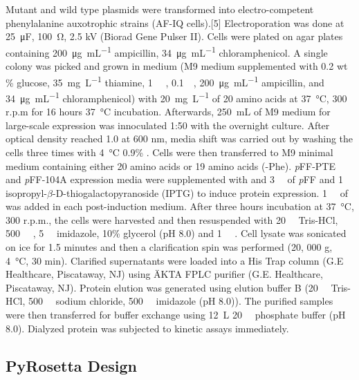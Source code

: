 \begin{refsection}
Mutant and wild type plasmids were transformed into electro-competent  phenylalanine auxotrophic strains (AF-IQ cells).[5] Electroporation was
done at \SI{25}{\micro\farad}, \SI{100}{\ohm}, 2.5 kV (Biorad Gene Pulser II).
Cells were plated on agar plates containing \SI{200}{\ug\per\mL} ampicillin,
\SI{34}{\ug\per\mL} chloramphenicol. A single colony was picked and grown in
medium (M9 medium supplemented with 0.2 wt \% glucose, \SI{35}{\mg\per\L}
thiamine, \SI{1}{\milli\Molar} , \SI{0.1}{\milli\Molar},
\SI{200}{\ug\per\mL} ampicillin, and \SI{34}{\ug\per\mL} chloramphenicol) with
\SI{20}{\mg\per\L} of 20 amino acids at \SI{37}{\celsius}, 300 r.p.m for 16
hours \SI{37}{\celsius} incubation.  Afterwards, \SI{250}{\mL} of M9 medium for
large-scale expression was innoculated 1:50 with the overnight culture.  After
optical density reached 1.0 at 600 nm, media shift was carried out by washing
the cells three times with \SI{4}{\celsius} 0.9\% .  Cells were then
transferred to M9 minimal medium containing either 20 amino acids or 19 amino
acids (-Phe). \emph{p}FF-PTE and \emph{p}FF-104A expression media were
supplemented with and \SI{3}{\milli\Molar} of \emph{p}FF and
\SI{1}{\milli\Molar} isopropyl-$\beta$-D-thiogalactopyranoside (IPTG) to induce
protein expression.  \SI{1}{\milli\Molar} of  was added in each
post-induction medium.  After three hours incubation at \SI{37}{\celsius}, 300
r.p.m., the cells were harvested and then resuspended with
\SI{20}{\milli\Molar} Tris-HCl, \SI{500}{\milli\Molar} ,
\SI{5}{\milli\Molar} imidazole, 10\% glycerol (pH 8.0) and \SI{1}{\micro\Molar}
. Cell lysate was sonicated on ice for 1.5 minutes and then a
clarification spin was performed (20, 000 g, \SI{4}{\celsius}, 30 min).
Clarified supernatants were loaded into a His Trap column (G.E Healthcare,
Piscataway, NJ) using ÄKTA FPLC purifier (G.E.  Healthcare, Piscataway, NJ).
Protein elution was generated using elution buffer B (\SI{20}{\milli\Molar}
Tris-HCl, \SI{500}{\milli\Molar} sodium chloride, \SI{500}{\milli\Molar}
imidazole (pH 8.0)).  The purified samples were then transferred for buffer
exchange using \SI{12}{\L} \SI{20}{\milli\Molar} phosphate buffer (pH 8.0).
Dialyzed protein was subjected to kinetic assays immediately.

\subsection{PyRosetta Design}
\label{sec:rosetta-method}


\end{refsection}
